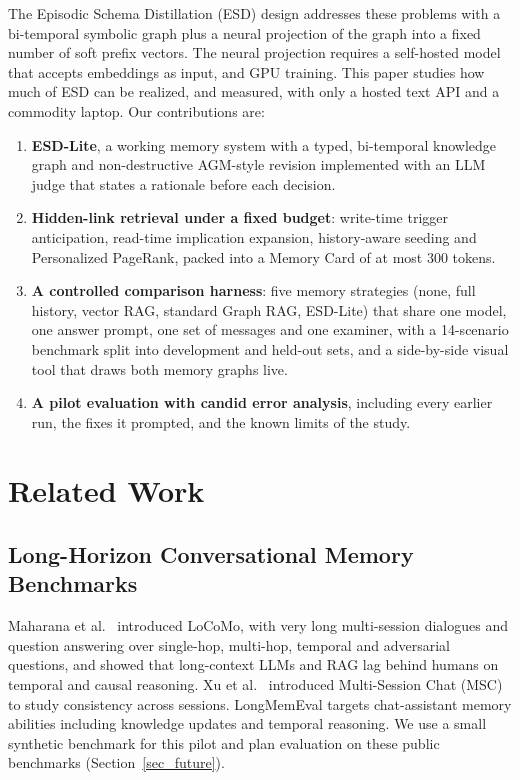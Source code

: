 \documentclass[conference]{IEEEtran}
\begin{document}
The Episodic Schema Distillation (ESD) design addresses these problems with a bi-temporal symbolic graph plus a neural projection of the graph into a fixed number of soft prefix vectors. The neural projection requires a self-hosted model that accepts embeddings as input, and GPU training. This paper studies how much of ESD can be realized, and measured, with only a hosted text API and a commodity laptop. Our contributions are:
\begin{enumerate}
\item \textbf{ESD-Lite}, a working memory system with a typed, bi-temporal knowledge graph and non-destructive AGM-style revision implemented with an LLM judge that states a rationale before each decision.
\item \textbf{Hidden-link retrieval under a fixed budget}: write-time trigger anticipation, read-time implication expansion, history-aware seeding and Personalized PageRank, packed into a Memory Card of at most 300 tokens.
\item \textbf{A controlled comparison harness}: five memory strategies (none, full history, vector RAG, standard Graph RAG, ESD-Lite) that share one model, one answer prompt, one set of messages and one examiner, with a 14-scenario benchmark split into development and held-out sets, and a side-by-side visual tool that draws both memory graphs live.
\item \textbf{A pilot evaluation with candid error analysis}, including every earlier run, the fixes it prompted, and the known limits of the study.
\end{enumerate}

\section{Related Work}

\subsection{Long-Horizon Conversational Memory Benchmarks}
Maharana et al.\ \cite{b_locomo} introduced LoCoMo, with very long multi-session dialogues and question answering over single-hop, multi-hop, temporal and adversarial questions, and showed that long-context LLMs and RAG lag behind humans on temporal and causal reasoning. Xu et al.\ \cite{b_msc} introduced Multi-Session Chat (MSC) to study consistency across sessions. LongMemEval \cite{b_longmemeval} targets chat-assistant memory abilities including knowledge updates and temporal reasoning. We use a small synthetic benchmark for this pilot and plan evaluation on these public benchmarks (Section~\ref{sec_future}).
\end{document}
